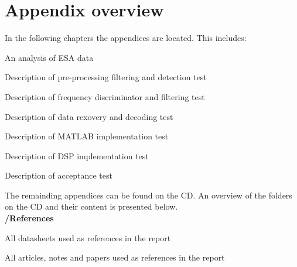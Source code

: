 \chapter{Appendix overview}  \label{ch:appoverviews}
In the following chapters the appendices are located. This includes:
\begin{pitemize}
    \item An analysis of ESA data
    \item Description of pre-processing filtering and detection test
    \item Description of frequency discriminator and filtering test
    \item Description of data rexovery and decoding test
    \item Description of MATLAB implementation test
    \item Description of DSP implementation test
    \item Description of acceptance test
\end{pitemize}

The remainding appendices can be found on the CD. An overview of the folders on the CD and their content is presented below.\\

\textbf{/References}\\
\vspace{-10mm}
    \begin{pitemize}
        \item All datasheets used as references in the report
        \item All articles, notes and papers used as references in the report
    \end{pitemize}
 
